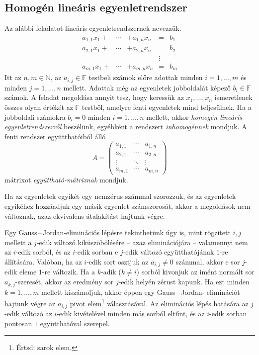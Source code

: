 \documentclass[a4paper, showtrims]{memoir}
\theoremstyle{plain}
\theoremstyle{remark}
\theoremstyle{definition}
\begin{document}
\subsection{Homogén lineáris egyenletrendszer}
Az alábbi feladatot lineáris egyenletrendszernek nevezzük.
\[
	\begin{array}{rrlcl}
		a_{1,1}x_1+ & \cdots & +a_{1,n}x_n & =      & b_1 \\
		a_{2,1}x_1+ & \cdots & +a_{2,n}x_n & =      & b_2 \\
		            &        &             & \vdots &     \\
		a_{m,1}x_1+ & \cdots & +a_{m,n}x_n & =      & b_m
	\end{array}
\]
Itt az $n,m\in\mathbb{N}$, az $a_{i,j}\in\mathbb{F}$ testbeli számok előre adottak
minden $i=1,\ldots,m$ és minden $j=1,\ldots,n$ mellett.
Adottak még az egyenletek jobboldalát képező $b_i\in\mathbb{F}$ számok.
A feladat megoldása annyit tesz, hogy keressük az $x_1,\ldots,x_n$ ismeretlenek
összes olyan értékét az $\mathbb{F}$ testből,
amelyre fenti egyenletek mind teljesülnek.
Ha a jobboldali számokra $b_i=0$ minden $i=1,\ldots,n$ mellett,
akkor
\emph{homogén lineáris egyenletrendszerről}%
beszélünk,
egyébként a rendszert
\emph{inhomogénnek}%
mondjuk.
A fenti rendszer együtthatóiból álló
\[
	A=
	\begin{pmatrix}
		a_{1,1} & \cdots & a_{1,n} \\
		a_{2,1} & \cdots & a_{2,n} \\
		\vdots  & \ddots & \vdots  \\
		a_{m,1} & \cdots & a_{m,n}
	\end{pmatrix}
\]
mátrixot
\emph{együttható-mátrixnak}%
mondjuk.

Ha az egyenletek egyikét egy nemzérus számmal szorozzuk,
és az egyenletek egyikéhez hozzáadjuk egy másik egyenlet számszorosát,
akkor a megoldások nem változnak,
azaz ekvivalens átalakítást hajtunk végre.

Egy Gauss\,--\,Jordan-eliminációs  lépésre tekinthetünk úgy is,
mint rögzített $i,j$ mellett a $j$-edik változó kiküszöbölésére
-- azaz eliminációjára --
valamennyi nem az $i$-edik sorból,
és az $i$-edik sorban e $j$-edik változó együtthatójának $1$-re állítására.
Valóban,
ha az $i$-edik sort osztjuk az $a_{i,j}\neq 0$ számmal, akkor e sor $j$-edik
eleme $1$-re változik.
Ha a $k$-adik ($k\neq i$) sorból kivonjuk az imént normált sor
$a_{k,j}$-szeresét, akkor az eredmény sor $j$-edik helyén zérust kapunk.
Ha ezt minden $k=1,\ldots,m$ mellett kiszámoljuk, akkor éppen egy Gauss\,--\,Jordan-%
eliminációt hajtunk végre az $a_{i,j}$ pivot elem\footnote{Értsd: sarok elem.} választásával.
Az eliminációs lépés hatására az $j$-edik változó az $i$-edik kivételével
minden más sorból eltűnt, és az $i$-edik sorban pontosan $1$ együtthatóval szerepel.
\end{document}

